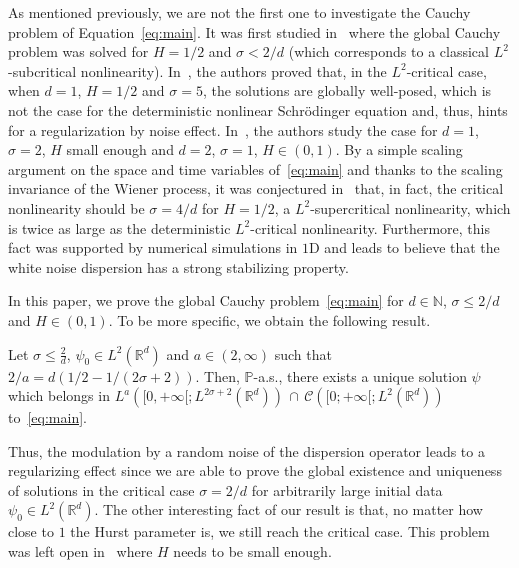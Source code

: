 \documentclass[AHL,Unicode,longabstracts,published]{cedram}
\newcommand{\bbP}{\mathbb{P}}
\newcommand{\bbR}{\mathbb{R}}
\newcommand{\bbN}{\mathbb{N}}
\newcommand{\clC}{\mathcal{C}}
\begin{document}
As mentioned previously, we are not the first one to investigate the Cauchy problem of Equation~\eqref{eq:main}. It was first studied in~\cite{de2010nonlinear} where the global Cauchy problem was solved for $H = 1/2$ and $\sigma < 2/d$ (which corresponds to a classical $L^2$-subcritical nonlinearity). In~\cite{debussche20111d}, the authors proved that, in the $L^2$-critical case, when $d = 1$, $H = 1/2$ and $\sigma = 5$, the solutions are globally well-posed, which is not the case for the deterministic nonlinear Schr\"odinger equation and, thus, hints for a regularization by noise effect. In~\cite{chouk2015nonlinear}, the authors study the case for $d=1$, $\sigma = 2$, $H$ small enough and $d=2$, $\sigma = 1$, $H\in(0,1)$. By a simple scaling argument on the space and time variables of~\eqref{eq:main} and thanks to the scaling invariance of the Wiener process, it was conjectured in~\cite{belaouar2015numerical} that, in fact, the critical nonlinearity should be $\sigma = 4/d$ for $H= 1/2$, a $L^2$-supercritical nonlinearity, which is twice as large as the deterministic $L^2$-critical nonlinearity. Furthermore, this fact was supported by numerical simulations in $1$D and leads to believe that the white noise dispersion has a strong stabilizing property.

In this paper, we prove the global Cauchy problem~\eqref{eq:main} for $d\in\bbN$, $\sigma\leq 2/d$ and $H\in(0,1)$. To be more specific, we obtain the following result.

\begin{theo}\label{thm:main}
Let $\sigma\leq \frac{2}{d}$, $\psi_0\in L^2(\bbR^d)$ and $a\in (2,\infty)$ such that $2/a = d\left(1/2-1/(2\sigma+2)\right)$. Then, $\bbP$-a.s., there exists a unique solution $\psi$ which belongs in $L^{a}([0,+\infty[;L^{2\sigma+2}(\bbR^d))\,\cap\, \clC([0;+\infty[;L^2(\bbR^d))$ to~\eqref{eq:main}.
\end{theo}

\begin{rema}
Thus, the modulation by a random noise of the dispersion operator leads to a regularizing effect since we are able to prove the global existence and uniqueness of solutions in the critical case $\sigma = 2/d$ for arbitrarily large initial data $\psi_0\in L^2(\bbR^d)$. The other interesting fact of our result is that, no matter how close to $1$ the Hurst parameter is, we still reach the critical case. This problem was left open in~\cite{chouk2015nonlinear} where $H$ needs to be small enough.
\end{rema}
\end{document}
